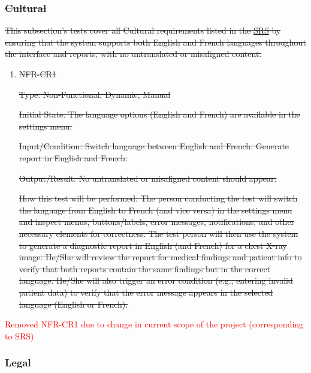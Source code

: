 \documentclass[12pt, titlepage]{article}
\begin{document}
\begin{enumerate}
\begin{enumerate}
\end{enumerate}

\subsubsection{\texorpdfstring{\sout{Cultural}}{Cultural}}

\sout{This subsection's tests cover all Cultural requirements listed in the \href{https://github.com/RezaJodeiri/CXR-Capstone/blob/main/docs/SRS/SRS.pdf}{SRS}
 by ensuring that the system supports both English and French languages throughout the interface and reports, with no untranslated or misaligned content.}\citep{SRS}

\begin{enumerate}

\item{\sout{NFR-CR1}}\label{NFR-CR1}

\sout{Type: Non-Functional, Dynamic, Manual}

\sout{Initial State: The language options (English and French) are available in the settings menu.}

\sout{Input/Condition: Switch language between English and French. Generate report in English and French.}

\sout{Output/Result: No untranslated or misaligned content should appear.}

\sout{How this test will be performed: The person conducting the test will switch the language from English to French (and vice versa) in the settings menu and inspect menus, buttons/labels, error messages, notifications, and other necessary elements for correctness. The test person will then use the system to generate a diagnostic report in English (and French) for a chest X-ray image. He/She will review the report for medical findings and patient info to verify that both reports contain the same findings but in the correct language. He/She will also trigger an error condition (e.g., entering invalid patient data) to verify that the error message appears in the selected language (English or French).}

\end{enumerate}

\textcolor{red}{Removed NFR-CR1 due to change in current scope of the project (corresponding to SRS)}

\subsubsection{Legal}


\end{enumerate}
\end{document}

